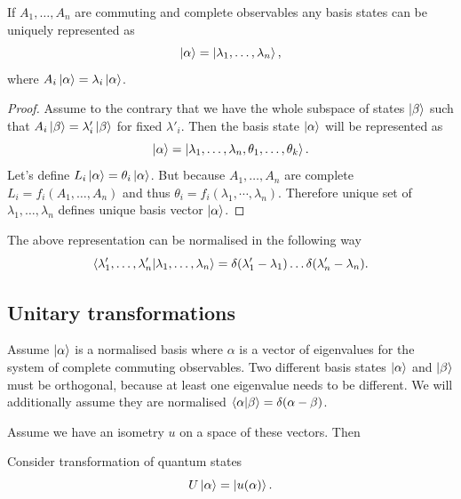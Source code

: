 \documentclass[main.tex]{subfiles}
\begin{document}
\begin{fact}
If $A_1, \dots, A_n$ are commuting and complete observables any basis states can be uniquely represented as 
\begin{equation}
\ket{\alpha} = \ket{\lambda_1, \dots, \lambda_n},
\end{equation}
where $A_i \ket{\alpha} = \lambda_i \ket{\alpha}$.  
\end{fact}
\begin{proof}
Assume to the contrary that we have the whole subspace of states $\ket{\beta}$ such that $A_i \ket{\beta} = \lambda'_i \ket{\beta}$ for fixed $\lambda'_i$. Then the basis state $\ket{\alpha}$ will be represented as
\begin{equation}
 \ket{\alpha} = \ket{\lambda_1, \dots, \lambda_n, \theta_1, \dots, \theta_k}.
\end{equation}
Let's define $L_i\ket{\alpha} = \theta_i \ket{\alpha}$. But because $A_1, \dots, A_n$ are complete $L_i = f_i(A_1, \dots, A_n)$ and thus $\theta_i = f_i(\lambda_1, \cdots, \lambda_n)$. Therefore unique set of  $\lambda_1, \dots, \lambda_n$ defines unique basis vector $\ket{\alpha}$.
\end{proof}

The above representation can be normalised in the following way
\begin{equation}
\bra{\lambda'_1, \dots, \lambda'_n}\ket{\lambda_1, \dots, \lambda_n} = \delta(\lambda'_1 - \lambda_1)\dots\delta(\lambda'_n - \lambda_n).
\end{equation}

\subsection{Unitary transformations}

Assume $\ket{\alpha}$ is a normalised basis where $\alpha$ is a vector of eigenvalues for the system of complete commuting observables. Two different basis states $\ket{\alpha}$ and $\ket{\beta}$ must be orthogonal, because at least one eigenvalue needs to be different. We will additionally assume they are normalised $\bra{\alpha}\ket{\beta}= \delta(\alpha - \beta)$. 

Assume we have an isometry $u$ on a space of these vectors. Then 

Consider transformation of quantum states
\begin{equation}
U \ket{\alpha} = \ket{u(\alpha)}.
\end{equation} 
\end{document}
